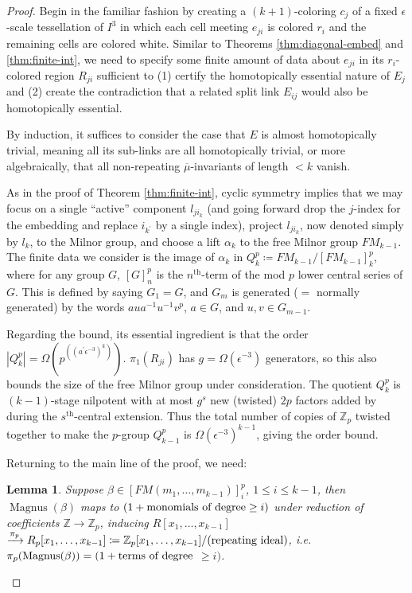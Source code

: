 \documentclass[12pt]{amsart}
\newcommand{\ra}{\rightarrow}
\newcommand{\pr}{\prime}
\newcommand{\Z}{\mathbb{Z}}
\newcommand{\abs}[1]{\left\lvert #1 \right\rvert}
\newcommand{\lbar}[1]{\overline{#1}}
\newtheorem{lemma}[thm]{Lemma}
\theoremstyle{definition}
\theoremstyle{remark}
\begin{document}
\begin{proof}
	Begin in the familiar fashion by creating a $(k+1)$-coloring $c_j$ of a fixed $\epsilon$-scale tessellation of $I^3$ in which each cell meeting $e_{ji}$ is colored $r_i$ and the remaining cells are colored white. Similar to Theorems \ref{thm:diagonal-embed} and \ref{thm:finite-int}, we need to specify some finite amount of data about $e_{ji}$ in its $r_i$-colored region $R_{ji}$ sufficient to (1) certify the homotopically essential nature of $E_j$ and (2) create the contradiction that a related split link $E_{ij}$ would also be homotopically essential.

	By induction, it suffices to consider the case that $E$ is almost homotopically trivial, meaning all its sub-links are all homotopically trivial, or more algebraically, that all non-repeating $\lbar{\mu}$-invariants of length $<k$ vanish.

	As in the proof of Theorem \ref{thm:finite-int}, cyclic symmetry implies that we may focus on a single ``active'' component $l_{ji_k}$ (and going forward drop the $j$-index for the embedding and replace $i_{k^\pr}$ by a single index), project $l_{ji_k}$, now denoted simply by $l_k$, to the Milnor group, and choose a lift $\alpha_k$ to the free Milnor group $FM_{k-1}$. The finite data we consider is the image of $\alpha_k$ in $Q_k^p \coloneqq FM_{k-1} \slash [FM_{k-1}]_k^p$, where for any group $G$, $[G]_n^p$ is the $n^{\text{th}}$-term of the mod $p$ lower central series of $G$. This is defined by saying $G_1 = G$, and $G_m$ is generated ($=$ normally generated) by the words $a u a^{-1} u^{-1} v^p$, $a \in G$, and $u,v \in G_{m-1}$.

	Regarding the bound, its essential ingredient is that the order $\abs{Q_k^p} = \Omega\left(p^{\left((a^\pr \epsilon^{-3})^k\right)}\right)$. $\pi_1(R_{ji})$ has $g = \Omega(\epsilon^{-3})$ generators, so this also bounds the size of the free Milnor group under consideration. The quotient $Q_k^p$ is $(k-1)$-stage nilpotent with at most $g^s$ new (twisted) $2p$ factors added by during the $s^{\text{th}}$-central extension. Thus the total number of copies of $\Z_p$ twisted together to make the $p$-group $Q_{k-1}^p$ is $\Omega(\epsilon^{-3})^{k-1}$, giving the order bound.

	Returning to the main line of the proof, we need:

	\begin{lemma}\label{lm:fm}
		Suppose $\beta \in [FM(m_1,\dots,m_{k-1})]_i^p$, $1 \leq i \leq k-1$, then $\operatorname{Magnus}(\beta)$ maps to $(1 + \textup{monomials of degree} \geq i)$ under reduction of coefficients $\Z \ra \Z_p$, inducing $R[x_1,\dots,x_{k-1}]$ $\xrightarrow{\pi_p} R_p[x_1,\dots,x_{k-1}] \coloneqq \Z_p[x_1,\dots,x_{k-1}] \slash (\textup{repeating ideal})$, i.e.\ $\pi_p(\operatorname{Magnus}(\beta)) = (1 + \textup{terms of degree}$ $\geq i)$.
	\end{lemma}


\end{proof}
\end{document}
